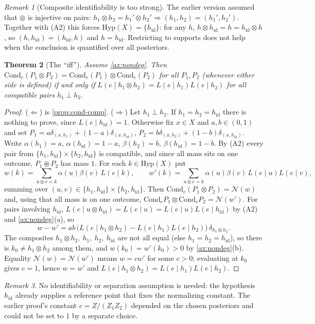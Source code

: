\documentclass[11pt]{article}
\newtheorem{theorem}{Theorem}[section]
\theoremstyle{definition}
\theoremstyle{remark}
\newtheorem{remark}[theorem]{Remark}
\newcommand{\Hyp}{\mathrm{Hyp}}
\newcommand{\Cond}{\mathrm{Cond}}
\newcommand{\hid}{h_{\mathrm{id}}}
\newcommand{\N}{\mathcal{N}}
\newcommand{\cp}{\circledast}
\begin{document}
\begin{remark}[Composite identifiability is too strong]\label{rem:ci}
The earlier version assumed that $\otimes$ is injective on pairs:
$h_1\otimes h_2=h_1'\otimes h_2'\Rightarrow(h_1,h_2)=(h_1',h_2')$. Together with (A2) this forces
$\Hyp(X)=\{\hid\}$: for any $h$, $h\otimes\hid=h=\hid\otimes h$, so $(h,\hid)=(\hid,h)$ and $h=\hid$.
Restricting to supports does not help when the conclusion is quantified over all posteriors.
\end{remark}

\begin{theorem}[The ``iff'']\label{thm:iff}
Assume \cref{ax:nondeg}. Then $\Cond_e(P_1\otimes P_2)=\Cond_e(P_1)\otimes\Cond_e(P_2)$ for all
$P_1,P_2$ (whenever either side is defined) if and only if
$L(e\mid h_1\otimes h_2)=L(e\mid h_1)L(e\mid h_2)$ for all compatible pairs $h_1\perp h_2$.
\end{theorem}
\begin{proof}
($\Leftarrow$) is \cref{prop:cond-comp}. ($\Rightarrow$) Let $h_1\perp h_2$. If $h_1=h_2=\hid$ there
is nothing to prove, since $L(e\mid\hid)=1$. Otherwise fix $x\in X$ and $a,b\in(0,1)$ and set
$P_1=a\delta_{(x,h_1)}+(1-a)\delta_{(x,\hid)}$, $P_2=b\delta_{(x,h_2)}+(1-b)\delta_{(x,\hid)}$. Write
$\alpha(h_1)=a$, $\alpha(\hid)=1-a$, $\beta(h_2)=b$, $\beta(\hid)=1-b$. By (A2) every pair from
$\{h_1,\hid\}\times\{h_2,\hid\}$ is compatible, and since all mass sits on one outcome, $P_1\cp P_2$
has mass $1$. For each $k\in\Hyp(X)$ put
\[
w(k)=\sum_{u\otimes v=k}\alpha(u)\beta(v)\,L(e\mid k),\qquad
w'(k)=\sum_{u\otimes v=k}\alpha(u)\beta(v)\,L(e\mid u)L(e\mid v),
\]
summing over $(u,v)\in\{h_1,\hid\}\times\{h_2,\hid\}$. Then $\Cond_e(P_1\otimes P_2)=\N(w)$ and, using
that all mass is on one outcome, $\Cond_eP_1\otimes\Cond_eP_2=\N(w')$. For pairs involving $\hid$,
$L(e\mid u\otimes\hid)=L(e\mid u)=L(e\mid u)L(e\mid\hid)$ by (A2) and \cref{ax:nondeg}(a), so
\[
w-w'=ab\,\big(L(e\mid h_1\otimes h_2)-L(e\mid h_1)L(e\mid h_2)\big)\,\delta_{h_1\otimes h_2}.
\]
The composites $h_1\otimes h_2,\ h_1,\ h_2,\ \hid$ are not all equal (else $h_1=h_2=\hid$), so there is
$k_0\neq h_1\otimes h_2$ among them, and $w(k_0)=w'(k_0)>0$ by \cref{ax:nondeg}(b). Equality
$\N(w)=\N(w')$ means $w=cw'$ for some $c>0$; evaluating at $k_0$ gives $c=1$, hence $w=w'$ and
$L(e\mid h_1\otimes h_2)=L(e\mid h_1)L(e\mid h_2)$.
\end{proof}

\begin{remark}
No identifiability or separation assumption is needed: the hypothesis $\hid$ already supplies a
reference point that fixes the normalizing constant. The earlier proof's constant
$c=Z/(Z_1Z_2)$ depended on the chosen posteriors and could not be set to $1$ by a separate choice.
\end{remark}
\end{document}
